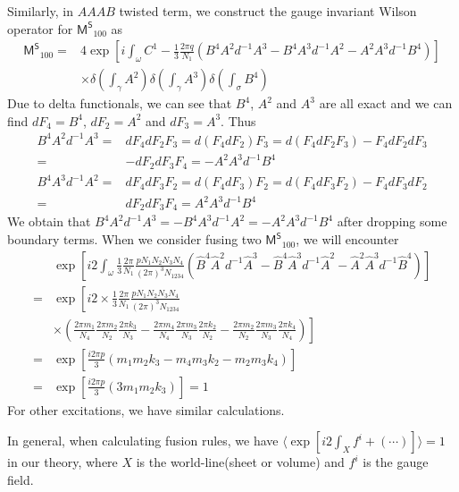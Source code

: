 \documentclass[11pt,nofootinbib,preprint]{revtex4-1}
\begin{document}
Similarly, in $AAAB$ twisted term, we construct the gauge invariant Wilson operator for $\mathsf{M^S}_{100}$ as 
\begin{align}
	\mathsf{M^S}_{100}=&4\exp \left[ i\int_{\omega}{C^1-\frac{1}{3}\frac{2\pi q}{N_1}\left( B^4A^2d^{-1}A^3-B^4A^3d^{-1}A^2-A^2A^3d^{-1}B^4 \right)} \right] \nonumber
	\\
	&\times \delta \left( \int_{\gamma}{A^2} \right) \delta \left( \int_{\gamma}{A^3} \right) \delta \left( \int_{\sigma}{B^4} \right) 
\end{align}
Due to delta functionals, we can see that $B^4$, $A^2$ and $A^3$ are all exact and we can find $dF_4=B^4$, $dF_2=A^2$ and $dF_3=A^3$. Thus
\begin{align}
	B^4A^2d^{-1}A^3=&dF_4dF_2F_3=d\left( F_4dF_2 \right) F_3=d\left( F_4dF_2F_3 \right) -F_4dF_2dF_3 \nonumber
	\\
	=&-dF_2dF_3F_4=-A^2A^3d^{-1}B^4 \nonumber
	\\
	B^4A^3d^{-1}A^2=&dF_4dF_3F_2=d\left( F_4dF_3 \right) F_2=d\left( F_4dF_3F_2 \right) -F_4dF_3dF_2 \nonumber
	\\
	=&dF_2dF_3F_4=A^2A^3d^{-1}B^4
\end{align}
We obtain that $B^4A^2d^{-1}A^3=-B^4A^3d^{-1}A^2=-A^2A^3d^{-1}B^4$ after dropping some boundary terms. When we consider fusing two $\mathsf{M^S}_{100}$, we will encounter 
\begin{align}
	&\exp \left[ i2\int_{\omega}{\frac{1}{3}\frac{2\pi}{N_1}\frac{pN_1N_2N_3N_4}{\left( 2\pi \right) ^3N_{1234}}\left( \hat{B}^4\hat{A}^2d^{-1}\hat{A}^3-\hat{B}^4\hat{A}^3d^{-1}\hat{A}^2-\hat{A}^2\hat{A}^3d^{-1}\hat{B}^4 \right)} \right] \nonumber
	\\
	=&\exp \left[ i2\times \frac{1}{3}\frac{2\pi}{N_1}\frac{pN_1N_2N_3N_4}{\left( 2\pi \right) ^3N_{1234}} \right. \nonumber
	\\
	&\left. \times \left( \frac{2\pi m_1}{N_4}\frac{2\pi m_2}{N_2}\frac{2\pi k_3}{N_3}-\frac{2\pi m_4}{N_4}\frac{2\pi m_3}{N_3}\frac{2\pi k_2}{N_2}-\frac{2\pi m_2}{N_2}\frac{2\pi m_3}{N_3}\frac{2\pi k_4}{N_4} \right) \right] \nonumber
	\\
	=&\exp \left[ \frac{i2\pi p}{3}\left( m_1m_2k_3-m_4m_3k_2-m_2m_3k_4 \right) \right] \nonumber
	\\
	=&\exp \left[ \frac{i2\pi p}{3}\left( 3m_1m_2k_3\right) \right]=1
\end{align}
For other excitations, we have similar calculations. 

In general, when calculating fusion rules, we have $\langle \exp \left[ i2\int_{X}{f^i+\left( \cdots \right)} \right] \rangle =1$ in our theory, where $X$ is the world-line(sheet or volume) and $f^i$ is the gauge field. 
\end{document}
